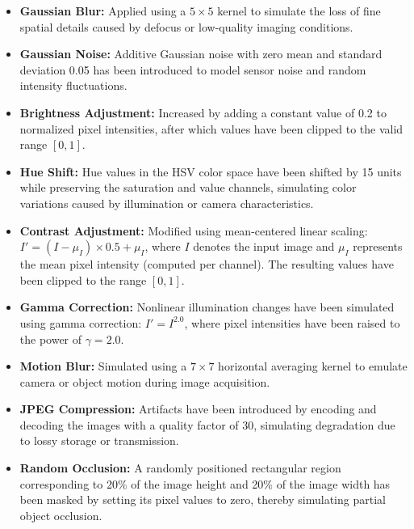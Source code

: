 \documentclass[a4paper,fleqn]{cas-dc}
\begin{document}
	\begin{itemize}
		\item \textbf{Gaussian Blur:} Applied using a $5 \times 5$ kernel to simulate the loss of fine spatial details caused by defocus or low-quality imaging conditions.
		
		\item \textbf{Gaussian Noise:} Additive Gaussian noise with zero mean and standard deviation 0.05 has been introduced to model sensor noise and random intensity fluctuations.
		
		\item \textbf{Brightness Adjustment:} Increased by adding a constant value of 0.2 to normalized pixel intensities, after which values have been clipped to the valid range $[0,1]$.
		
		\item \textbf{Hue Shift:} Hue values in the HSV color space have been shifted by 15 units while preserving the saturation and value channels, simulating color variations caused by illumination or camera characteristics.
		
		\item \textbf{Contrast Adjustment:} Modified using mean-centered linear scaling: $ I' = (I - \mu_I)\times 0.5 + \mu_I$, where $I$ denotes the input image and $\mu_I$ represents the mean pixel intensity (computed per channel). 
		The resulting values have been clipped to the range $[0,1]$.
		
		\item \textbf{Gamma Correction:} Nonlinear illumination changes have been simulated using gamma correction: $I' = I^{2.0}$, where pixel intensities have been raised to the power of $\gamma = 2.0$.
		
		\item \textbf{Motion Blur:} Simulated using a $7 \times 7$ horizontal averaging kernel to emulate camera or object motion during image acquisition.
		
		\item \textbf{JPEG Compression:} Artifacts have been introduced by encoding and decoding the images with a quality factor of 30, simulating degradation due to lossy storage or transmission.
		
		\item \textbf{Random Occlusion:} A randomly positioned rectangular region corresponding to 20\% of the image height and 20\% of the image width has been masked by setting its pixel values to zero, thereby simulating partial object occlusion.
	\end{itemize}
	
\end{document}

